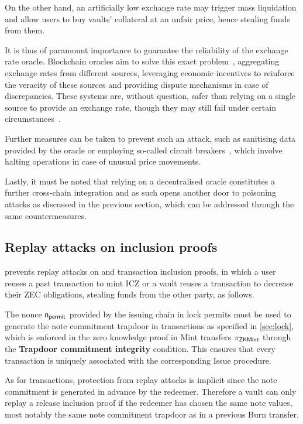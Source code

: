 On the other hand, an artificially low exchange rate may trigger mass liquidation and allow users to buy vaults' collateral at an unfair price, hence stealing funds from them.

It is thus of paramount importance to guarantee the reliability of the exchange rate oracle.
Blockchain oracles aim to solve this exact problem~\cite{peterson2015augur,8726819astraea,ellis2017chainlink}, aggregating exchange rates from different sources, leveraging economic incentives to reinforce the veracity of these sources and providing dispute mechanisms in case of discrepancies.
These systems are, without question, safer than relying on a single source to provide an exchange rate, though they may still fail under certain circumstances~\cite{lo2020reliabilityoracles}.

Further measures can be taken to prevent such an attack, such as sanitising data provided by the oracle or employing so-called circuit breakers~\cite{2019circuitbreakers}, which involve halting operations in case of unusual price movements.

Lastly, it must be noted that relying on a decentralised oracle constitutes a further cross-chain integration and as such opens another door to poisoning attacks as discussed in the previous section, which can be addressed through the same countermeasures.

\subsection{Replay attacks on inclusion proofs}

\zclaim prevents replay attacks on \lock and \release transaction inclusion proofs, in which a user reuses a past \lock transaction to mint ICZ or a vault reuses a \release transaction to decrease their ZEC obligations, stealing funds from the other party, as follows.

The nonce $\mathsf{n_{permit}}$ provided by the issuing chain in lock permits must be used to generate the note commitment trapdoor in \lock transactions as specified in \cref{sec:lock}, which is enforced in the zero knowledge proof in Mint transfers $\pi_{\mathsf{ZKMint}}$ through the \textbf{Trapdoor commitment integrity} condition.
This ensures that every \lock transaction is uniquely associated with the corresponding Issue procedure.

As for \release transactions, protection from replay attacks is implicit since the note commitment is generated in advance by the redeemer.
Therefore a vault can only replay a release inclusion proof if the redeemer has chosen the same note values, most notably the same note commitment trapdoor \rcm as in a previous Burn transfer.

